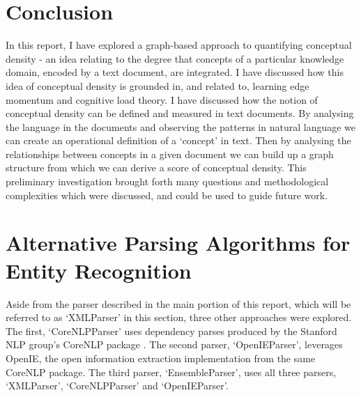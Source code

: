 \documentclass[12pt]{article}
\theoremstyle{grammarstyle}
\begin{document}

\section{Conclusion} \label{sec:conclusion}
In this report, I have explored a graph-based approach to quantifying conceptual density - an idea relating to the degree that concepts of a particular knowledge domain, encoded by a text document, are integrated. I have discussed how this idea of conceptual density is grounded in, and related to, learning edge momentum and cognitive load theory. I have discussed how the notion of conceptual density can be defined and measured in text documents. By analysing the language in the documents and observing the patterns in natural language we can create an operational definition of a `concept' in text. Then by analysing the relationships between concepts in a given document we can build up a graph structure from which we can derive a score of conceptual density. This preliminary investigation brought forth many questions and methodological complexities which were discussed, and could be used to guide future work.

% 





\appendix

\section{Alternative Parsing Algorithms for Entity Recognition} \label{sec:alternative_parsers}
Aside from the parser described in the main portion of this report, which will be referred to as `XMLParser' in this section, three other approaches were explored. The first, `CoreNLPParser' uses dependency parses produced by the Stanford NLP group's CoreNLP package \citep{manning-EtAl:2014:P14-5}.
The second parser, `OpenIEParser', leverages OpenIE, the open information extraction implementation from the same CoreNLP package. The third parser, `EnsembleParser', uses all three parsers, `XMLParser', `CoreNLPParser' and `OpenIEParser'.
\end{document}
